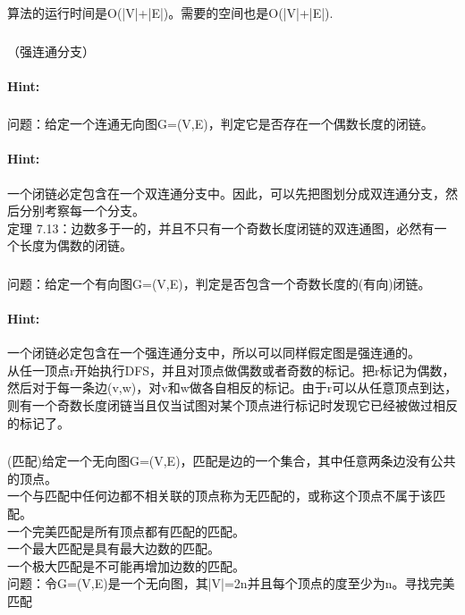 \documentclass{article}
\begin{document}
     算法的运行时间是O(|V|+|E|)。需要的空间也是O(|V|+|E|).
     
     \subsubsection{}（强连通分支）
     \paragraph{Hint:}
     
     
      \subsubsection{}问题：给定一个连通无向图G=(V,E)，判定它是否存在一个偶数长度的闭链。
     \paragraph{Hint:}一个闭链必定包含在一个双连通分支中。因此，可以先把图划分成双连通分支，然后分别考察每一个分支。\\
定理 7.13：边数多于一的，并且不只有一个奇数长度闭链的双连通图，必然有一个长度为偶数的闭链。\\

     
    \subsubsection{}问题：给定一个有向图G=(V,E)，判定是否包含一个奇数长度的(有向)闭链。
     \paragraph{Hint:}一个闭链必定包含在一个强连通分支中，所以可以同样假定图是强连通的。\\
从任一顶点r开始执行DFS，并且对顶点做偶数或者奇数的标记。把r标记为偶数，然后对于每一条边(v,w)，对v和w做各自相反的标记。由于r可以从任意顶点到达，则有一个奇数长度闭链当且仅当试图对某个顶点进行标记时发现它已经被做过相反的标记了。\\
     
     
      \subsubsection{}(匹配)给定一个无向图G=(V,E)，匹配是边的一个集合，其中任意两条边没有公共的顶点。\\
一个与匹配中任何边都不相关联的顶点称为无匹配的，或称这个顶点不属于该匹配。\\
一个完美匹配是所有顶点都有匹配的匹配。\\
一个最大匹配是具有最大边数的匹配。\\
一个极大匹配是不可能再增加边数的匹配。\\
问题：令G=(V,E)是一个无向图，其|V|=2n并且每个顶点的度至少为n。寻找完美匹配
\end{document}
